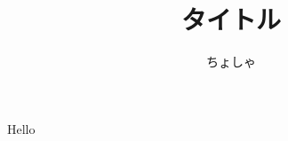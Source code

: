 \documentclass[11pt,a4paper,titlepage]{ujarticle}
\begin{document}
\title{タイトル}
\author{ちょしゃ}
\maketitle

Hello \\
\end{document}
